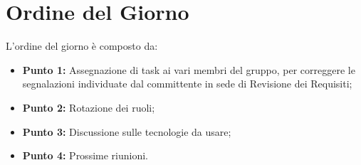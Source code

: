 \section{Ordine del Giorno}
L'ordine del giorno è composto da: 
\begin{itemize}
	\item \textbf{Punto 1:} Assegnazione di task ai vari membri del gruppo, per correggere le segnalazioni individuate dal committente in sede di Revisione dei Requisiti;
	\item \textbf{Punto 2:} Rotazione dei ruoli;
	\item \textbf{Punto 3:} Discussione sulle tecnologie da usare;
	\item \textbf{Punto 4:} Prossime riunioni.
\end{itemize}
